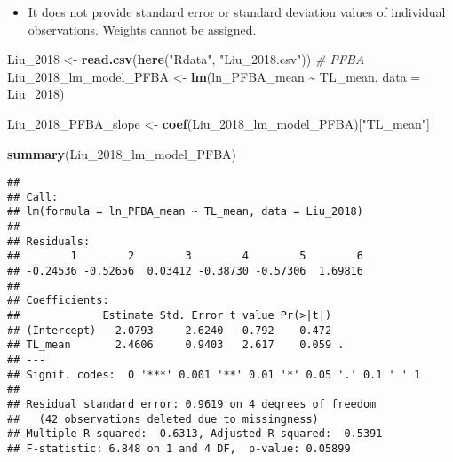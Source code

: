 \documentclass[
]{article}
\newenvironment{Shaded}{\begin{snugshade}}{\end{snugshade}}
\newcommand{\AttributeTok}[1]{\textcolor[rgb]{0.13,0.29,0.53}{#1}}
\newcommand{\CommentTok}[1]{\textcolor[rgb]{0.56,0.35,0.01}{\textit{#1}}}
\newcommand{\FunctionTok}[1]{\textcolor[rgb]{0.13,0.29,0.53}{\textbf{#1}}}
\newcommand{\NormalTok}[1]{#1}
\newcommand{\OtherTok}[1]{\textcolor[rgb]{0.56,0.35,0.01}{#1}}
\newcommand{\SpecialCharTok}[1]{\textcolor[rgb]{0.81,0.36,0.00}{\textbf{#1}}}
\newcommand{\StringTok}[1]{\textcolor[rgb]{0.31,0.60,0.02}{#1}}
\providecommand{\tightlist}{%
  \setlength{\itemsep}{0pt}\setlength{\parskip}{0pt}}
\begin{document}
\begin{itemize}
\tightlist
\item
  It does not provide standard error or standard deviation values of
  individual observations. Weights cannot be assigned.
\end{itemize}

\begin{Shaded}
\begin{Highlighting}[]
\NormalTok{Liu\_2018 }\OtherTok{\textless{}{-}} \FunctionTok{read.csv}\NormalTok{(}\FunctionTok{here}\NormalTok{(}\StringTok{"Rdata"}\NormalTok{, }\StringTok{"Liu\_2018.csv"}\NormalTok{))}
\CommentTok{\# PFBA}
\NormalTok{Liu\_2018\_lm\_model\_PFBA }\OtherTok{\textless{}{-}} \FunctionTok{lm}\NormalTok{(ln\_PFBA\_mean }\SpecialCharTok{\textasciitilde{}}\NormalTok{ TL\_mean,}
                             \AttributeTok{data =}\NormalTok{ Liu\_2018)}

\NormalTok{Liu\_2018\_PFBA\_slope }\OtherTok{\textless{}{-}} \FunctionTok{coef}\NormalTok{(Liu\_2018\_lm\_model\_PFBA)[}\StringTok{"TL\_mean"}\NormalTok{]}

\FunctionTok{summary}\NormalTok{(Liu\_2018\_lm\_model\_PFBA)}
\end{Highlighting}
\end{Shaded}

\begin{verbatim}
## 
## Call:
## lm(formula = ln_PFBA_mean ~ TL_mean, data = Liu_2018)
## 
## Residuals:
##        1        2        3        4        5        6 
## -0.24536 -0.52656  0.03412 -0.38730 -0.57306  1.69816 
## 
## Coefficients:
##             Estimate Std. Error t value Pr(>|t|)  
## (Intercept)  -2.0793     2.6240  -0.792    0.472  
## TL_mean       2.4606     0.9403   2.617    0.059 .
## ---
## Signif. codes:  0 '***' 0.001 '**' 0.01 '*' 0.05 '.' 0.1 ' ' 1
## 
## Residual standard error: 0.9619 on 4 degrees of freedom
##   (42 observations deleted due to missingness)
## Multiple R-squared:  0.6313, Adjusted R-squared:  0.5391 
## F-statistic: 6.848 on 1 and 4 DF,  p-value: 0.05899
\end{verbatim}
\end{document}
